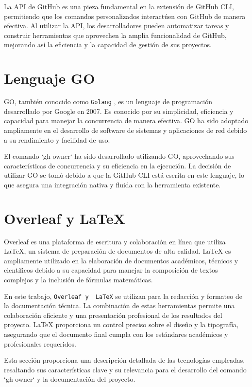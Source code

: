 La API de GitHub es una pieza fundamental en la extensión de GitHub CLI, permitiendo que los comandos personalizados interactúen con GitHub de manera efectiva. Al utilizar la API, los desarrolladores pueden automatizar tareas y construir herramientas que aprovechen la amplia funcionalidad de GitHub, mejorando así la eficiencia y la capacidad de gestión de sus proyectos.

\section{Lenguaje GO}
GO, también conocido como \verb|Golang| \cite{go-lang}, es un lenguaje de programación desarrollado por Google en 2007. Es conocido por su simplicidad, eficiencia y capacidad para manejar la concurrencia de manera efectiva. GO ha sido adoptado ampliamente en el desarrollo de software de sistemas y aplicaciones de red debido a su rendimiento y facilidad de uso.

El comando `gh owner` ha sido desarrollado utilizando GO, aprovechando sus características de concurrencia y su eficiencia en la ejecución. La decisión de utilizar GO se tomó debido a que la GitHub CLI está escrita en este lenguaje, lo que asegura una integración nativa y fluida con la herramienta existente.

\section{Overleaf y  \LaTeX{}}
Overleaf es una plataforma de escritura y colaboración en línea que utiliza  \LaTeX{}, un sistema de preparación de documentos de alta calidad.  \LaTeX{} es ampliamente utilizado en la elaboración de documentos académicos, técnicos y científicos debido a su capacidad para manejar la composición de textos complejos y la inclusión de fórmulas matemáticas.

En este trabajo, \verb|Overleaf y  LaTeX| \cite{latex-overleaf} se utilizan para la redacción y formateo de la documentación técnica. La combinación de estas herramientas permite una colaboración eficiente y una presentación profesional de los resultados del proyecto.  \LaTeX{} proporciona un control preciso sobre el diseño y la tipografía, asegurando que el documento final cumpla con los estándares académicos y profesionales requeridos.

Esta sección proporciona una descripción detallada de las tecnologías empleadas, resaltando sus características clave y su relevancia para el desarrollo del comando `gh owner` y la documentación del proyecto.